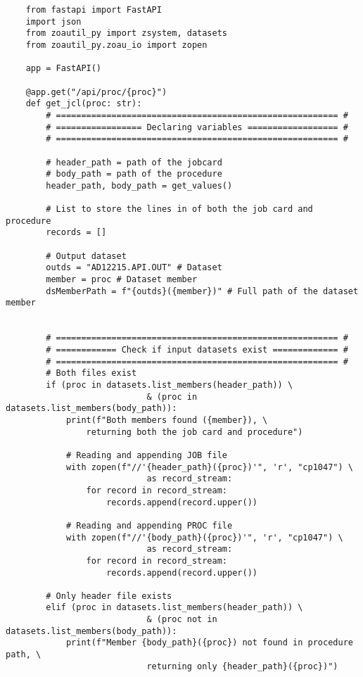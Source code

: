 \begin{lstlisting}
    from fastapi import FastAPI
    import json
    from zoautil_py import zsystem, datasets
    from zoautil_py.zoau_io import zopen
    
    app = FastAPI()
    
    @app.get("/api/proc/{proc}")
    def get_jcl(proc: str):
        # ======================================================== #
        # ================= Declaring variables ================== #
        # ======================================================== #
        
        # header_path = path of the jobcard
        # body_path = path of the procedure
        header_path, body_path = get_values()
        
        # List to store the lines in of both the job card and procedure
        records = []
        
        # Output dataset
        outds = "AD12215.API.OUT" # Dataset
        member = proc # Dataset member
        dsMemberPath = f"{outds}({member})" # Full path of the dataset member
        
        
        # ======================================================== #
        # ============ Check if input datasets exist ============= #
        # ======================================================== #
        # Both files exist
        if (proc in datasets.list_members(header_path)) \
                            & (proc in datasets.list_members(body_path)):
            print(f"Both members found ({member}), \
                returning both the job card and procedure")
        
            # Reading and appending JOB file
            with zopen(f"//'{header_path}({proc})'", 'r', "cp1047") \
                            as record_stream:
                for record in record_stream:
                    records.append(record.upper())
        
            # Reading and appending PROC file
            with zopen(f"//'{body_path}({proc})'", 'r', "cp1047") \
                            as record_stream:
                for record in record_stream:
                    records.append(record.upper())
        
        # Only header file exists
        elif (proc in datasets.list_members(header_path)) \
                            & (proc not in datasets.list_members(body_path)):
            print(f"Member {body_path}({proc}) not found in procedure path, \
                            returning only {header_path}({proc})")
            

\end{lstlisting}
